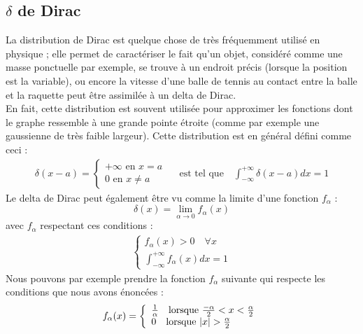 \documentclass[../notesdecours.tex]{subfiles}
\begin{document}
\subsection{$\delta$ de Dirac}
La distribution de Dirac est quelque chose de très fréquemment utilisé en physique ; elle permet de caractériser le fait qu'un objet, considéré comme une masse ponctuelle par exemple, se trouve à un endroit précis (lorsque la position est la variable), 
ou encore la vitesse d'une balle de tennis au contact entre la balle et la raquette peut être assimilée à un delta de Dirac. \\
En fait, cette distribution est souvent utilisée pour approximer les fonctions dont le graphe ressemble à une grande pointe étroite (comme par exemple une gaussienne de très faible largeur). %
Cette distribution est en général défini comme ceci :  
\begin{align}
    \delta(x-a) = \left\lbrace \begin{array}{lll}
        +\infty \mbox{ en $x = a$} \\
        0 \mbox{ en $x \ne a$} 
    \end{array}\right. \quad \mbox{ est tel que} \quad \int_{-\infty}^{+\infty} \delta(x-a) dx = 1
\end{align}
Le delta de Dirac peut également être vu comme la limite d'une fonction $f_{\alpha}$ : \begin{equation} 
    \delta(x) = \lim_{\alpha \to 0} f_{\alpha} (x) \end{equation}
avec $f_{\alpha}$ respectant ces conditions : 
\begin{align*}
    \left\lbrace \begin{array}{lll}
        f_{\alpha} (x) > 0 \quad \forall x \\
        \int_{-\infty}^{+\infty} f_{\alpha} (x) dx = 1
    \end{array}\right. 
\end{align*}
Nous pouvons par exemple prendre la fonction $f_{\alpha}$ suivante qui respecte les conditions que nous avons énoncées : 
\begin{align*}
    f_{\alpha} (x) = \left\lbrace \begin{array}{lll}
        \frac{1}{\alpha} \quad \mbox{lorsque } \frac{- \alpha}{2} < x < \frac{\alpha}{2} \\
        0 \quad \mbox{lorsque } \abs{x} > \frac{\alpha}{2}    
    \end{array}\right. 
\end{align*}
\end{document}
